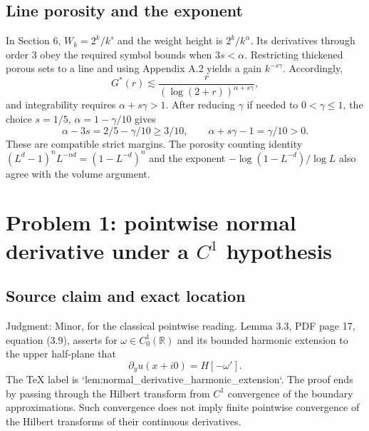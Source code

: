 \documentclass[10pt]{article}
\begin{document}
\subsection*{Line porosity and the exponent}
In Section 6, \(W_k=2^k/k^s\) and the weight height is \(2^k/k^\alpha\). Its derivatives through order 3 obey the required symbol bounds when \(3s<\alpha\). Restricting thickened porous sets to a line and using Appendix A.2 yields a gain \(k^{-s\gamma}\). Accordingly, \[G^*(r)\lesssim \frac{r}{(\log(2+r))^{\alpha+s\gamma}},\] and integrability requires \(\alpha+s\gamma>1\). After reducing \(\gamma\) if needed to \(0<\gamma\leq1\), the choice \(s=1/5\), \(\alpha=1-\gamma/10\) gives \[\alpha-3s=2/5-\gamma/10\geq3/10,\qquad
 \alpha+s\gamma-1=\gamma/10>0.\] These are compatible strict margins. The porosity counting identity \((L^d-1)^nL^{-nd}=(1-L^{-d})^n\) and the exponent \(-\log(1-L^{-d})/\log L\) also agree with the volume argument.\par
\section*{Problem 1: pointwise normal derivative under a \(C^1\) hypothesis}
\subsection*{Source claim and exact location}
Judgment: Minor, for the classical pointwise reading. Lemma 3.3, PDF page 17, equation (3.9), asserts for \(\omega\in C^1_0(\mathbb R)\) and its bounded harmonic extension to the upper half-plane that \[\partial_yu(x+i0)=H[-\omega'].\] The TeX label is `lem:normal\_derivative\_harmonic\_extension`. The proof ends by passing through the Hilbert transform from \(C^1\) convergence of the boundary approximations. Such convergence does not imply finite pointwise convergence of the Hilbert transforms of their continuous derivatives.\par
\end{document}
